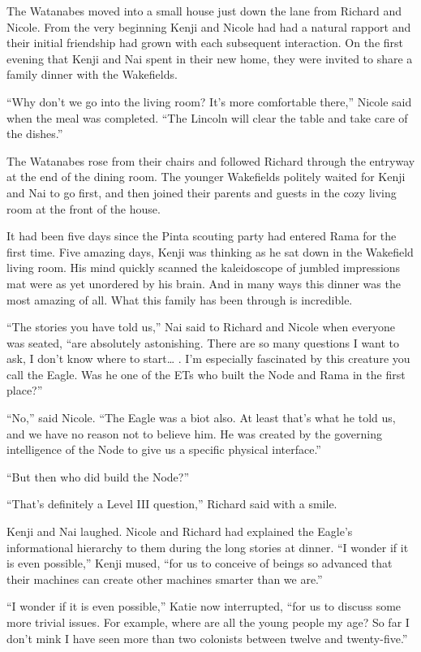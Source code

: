 \documentclass[]{article}
\begin{document}
{The Watanabes moved into a small house just down the lane from Richard and Nicole.  From the very beginning Kenji and Nicole had had a natural rapport and their initial friendship had grown with each subsequent interaction.  On the first evening that Kenji and Nai spent in their new home, they were invited to share a family dinner with the Wakefields.

“Why don’t we go into the living room? It’s more comfortable there,” Nicole said when the meal was completed.  “The Lincoln will clear the table and take care of the dishes.”

The Watanabes rose from their chairs and followed Richard through the entryway at the end of the dining room.  The younger Wakefields politely waited for Kenji and Nai to go first, and then joined their parents and guests in the cozy living room at the front of the house.

It had been five days since the Pinta scouting party had entered Rama for the first time.  Five amazing days, Kenji was thinking as he sat down in the Wakefield living room.  His mind quickly scanned the kaleidoscope of jumbled impressions mat were as yet unordered by his brain.  And in many ways this dinner was the most amazing of all.  What this family has been through is incredible.

“The stories you have told us,” Nai said to Richard and Nicole when everyone was seated, “are absolutely astonishing.  There are so many questions I want to ask, I don’t know where to start… .  I’m especially fascinated by this creature you call the Eagle.  Was he one of the ETs who built the Node and Rama in the first place?”

“No,” said Nicole.  “The Eagle was a biot also.  At least that’s what he told us, and we have no reason not to believe him.  He was created by the governing intelligence of the Node to give us a specific physical interface.”

“But then who did build the Node?”

“That’s definitely a Level III question,” Richard said with a smile.

Kenji and Nai laughed.  Nicole and Richard had explained the Eagle’s informational hierarchy to them during the long stories at dinner.  “I wonder if it is even possible,” Kenji mused, “for us to conceive of beings so advanced that their machines can create other machines smarter than we are.”

“I wonder if it is even possible,” Katie now interrupted, “for us to discuss some more trivial issues.  For example, where are all the young people my age? So far I don’t mink I have seen more than two colonists between twelve and twenty-five.”

}
\end{document}
